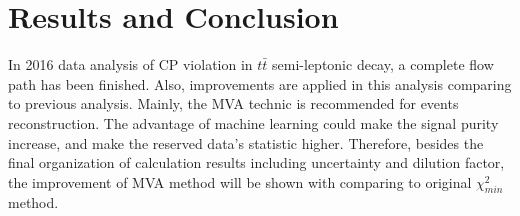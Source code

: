 

\section{Results and Conclusion}
\label{sec:Result}

	In 2016 data analysis of CP violation in $t\bar{t}$ semi-leptonic decay, a complete flow path has been finished. Also, improvements are applied in this analysis comparing to previous analysis. Mainly, the MVA technic is recommended for events reconstruction. The advantage of machine learning could make the signal purity increase, and make the reserved data's statistic higher. Therefore, besides the final organization of calculation results including uncertainty and dilution factor, the improvement of MVA method will be shown with comparing to original $\chi^2_{min}$ method.

\FloatBarrier
